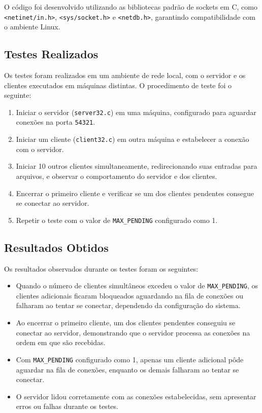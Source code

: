 \documentclass{article}
\begin{document}
O código foi desenvolvido utilizando as bibliotecas padrão de sockets em C, como \texttt{<netinet/in.h>}, \texttt{<sys/socket.h>} e \texttt{<netdb.h>}, garantindo compatibilidade com o ambiente Linux.

\subsection{Testes Realizados}

Os testes foram realizados em um ambiente de rede local, com o servidor e os clientes executados em máquinas distintas. O procedimento de teste foi o seguinte:

\begin{enumerate}
    \item Iniciar o servidor (\texttt{server32.c}) em uma máquina, configurado para aguardar conexões na porta \texttt{54321}.
    \item Iniciar um cliente (\texttt{client32.c}) em outra máquina e estabelecer a conexão com o servidor.
    \item Iniciar 10 outros clientes simultaneamente, redirecionando suas entradas para arquivos, e observar o comportamento do servidor e dos clientes.
    \item Encerrar o primeiro cliente e verificar se um dos clientes pendentes consegue se conectar ao servidor.
    \item Repetir o teste com o valor de \texttt{MAX\_PENDING} configurado como 1.
\end{enumerate}

\subsection{Resultados Obtidos}

Os resultados observados durante os testes foram os seguintes:

\begin{itemize}
    \item Quando o número de clientes simultâneos excedeu o valor de \texttt{MAX\_PENDING}, os clientes adicionais ficaram bloqueados aguardando na fila de conexões ou falharam ao tentar se conectar, dependendo da configuração do sistema.
    \item Ao encerrar o primeiro cliente, um dos clientes pendentes conseguiu se conectar ao servidor, demonstrando que o servidor processa as conexões na ordem em que são recebidas.
    \item Com \texttt{MAX\_PENDING} configurado como 1, apenas um cliente adicional pôde aguardar na fila de conexões, enquanto os demais falharam ao tentar se conectar.
    \item O servidor lidou corretamente com as conexões estabelecidas, sem apresentar erros ou falhas durante os testes.
\end{itemize}
\end{document}

